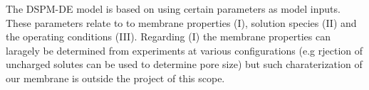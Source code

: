 The DSPM-DE model is based on using certain parameters as model inputs.
These parameters relate to to membrane properties (I), solution species (II) and the operating conditions (III).
Regarding (I) the membrane properties can laragely be determined from experiments at various configurations (e.g rjection of uncharged solutes can be used to determine pore size) but such charaterization of our membrane is outside the project of this scope.
